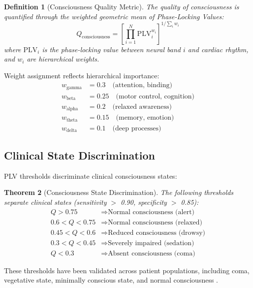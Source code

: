 \documentclass[12pt]{article}
\newtheorem{theorem}{Theorem}[section]
\newtheorem{definition}[theorem]{Definition}
\theoremstyle{remark}
\begin{document}
\begin{definition}[Consciousness Quality Metric]
The quality of consciousness is quantified through the weighted geometric mean of Phase-Locking Values:
\begin{equation}
Q_{\text{consciousness}} = \left[\prod_{i=1}^N \text{PLV}_i^{w_i}\right]^{1/\sum_i w_i}
\label{eq:consciousness_metric}
\end{equation}
where $\text{PLV}_i$ is the phase-locking value between neural band $i$ and cardiac rhythm, and $w_i$ are hierarchical weights.
\end{definition}

Weight assignment reflects hierarchical importance:
\begin{align}
w_{\text{gamma}} &= 0.3 \quad \text{(attention, binding)}\\
w_{\text{beta}} &= 0.25 \quad \text{(motor control, cognition)}\\
w_{\text{alpha}} &= 0.2 \quad \text{(relaxed awareness)}\\
w_{\text{theta}} &= 0.15 \quad \text{(memory, emotion)}\\
w_{\text{delta}} &= 0.1 \quad \text{(deep processes)}
\end{align}

\subsection{Clinical State Discrimination}

PLV thresholds discriminate clinical consciousness states:

\begin{theorem}[Consciousness State Discrimination]
The following thresholds separate clinical states (sensitivity $>$ 0.90, specificity $>$ 0.85):
\begin{align}
Q > 0.75 &\Rightarrow \text{Normal consciousness (alert)}\\
0.6 < Q < 0.75 &\Rightarrow \text{Normal consciousness (relaxed)}\\
0.45 < Q < 0.6 &\Rightarrow \text{Reduced consciousness (drowsy)}\\
0.3 < Q < 0.45 &\Rightarrow \text{Severely impaired (sedation)}\\
Q < 0.3 &\Rightarrow \text{Absent consciousness (coma)}
\end{align}
\end{theorem}

These thresholds have been validated across patient populations, including coma, vegetative state, minimally conscious state, and normal consciousness \citep{sitt2014large}.
\end{document}

